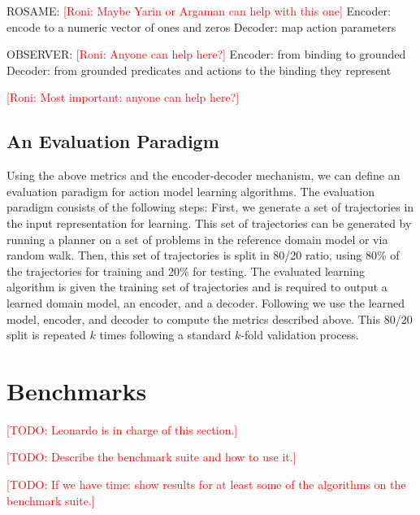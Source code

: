 \documentclass{article}
\theoremstyle{definition}
\theoremstyle{remark}
\newcommand{\todo}[1]{{\textcolor{red}{[TODO: #1]}}}
\newcommand{\roni}[1]{{\textcolor{red}{[Roni: #1]}}}
\begin{document}
ROSAME: \roni{Maybe Yarin or Argaman can help with this one}
Encoder: encode to a numeric vector of ones and zeros
Decoder: map action parameters

OBSERVER: \roni{Anyone can help here?}
Encoder: from binding to grounded
Decoder: from grounded predicates and actions to the binding they represent

\roni{Most important: anyone can help here?}


\subsection{An Evaluation Paradigm}
Using the above metrics and the encoder-decoder mechanism, we can define an evaluation paradigm for action model learning algorithms.
The evaluation paradigm consists of the following steps: 
First, we generate a set of trajectories in the input representation for learning. 
This set of trajectories can be generated by running a planner on a set of problems in the reference domain model or via random walk.
Then, this set of trajectories is split in 80/20 ratio, using 80\% of the trajectories for training and 20\% for testing. 
The evaluated learning algorithm is given the training set of trajectories and is required to output a learned domain model, an encoder, and a decoder. 
Following we use the learned model, encoder, and decoder to compute the metrics described above. 
This 80/20 split is repeated $k$ times following a standard $k$-fold validation process. 



\section{Benchmarks}

\todo{Leonardo is in charge of this section.}

\todo{Describe the benchmark suite and how to use it.}

\todo{If we have time: show results for at least some of the algorithms on the benchmark suite.}
\end{document}
